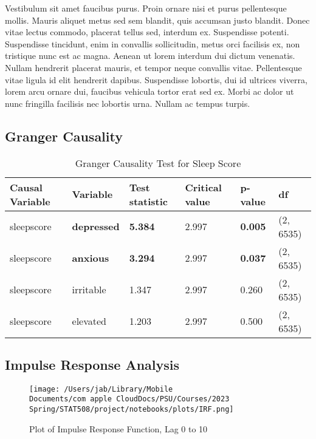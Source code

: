 \documentclass{article}
\begin{document}
Vestibulum sit amet faucibus purus. Proin ornare nisi et purus
pellentesque mollis. Mauris aliquet metus sed sem blandit, quis accumsan
justo blandit. Donec vitae lectus commodo, placerat tellus sed, interdum
ex. Suspendisse potenti. Suspendisse tincidunt, enim in convallis
sollicitudin, metus orci facilisis ex, non tristique nunc est ac magna.
Aenean ut lorem interdum dui dictum venenatis. Nullam hendrerit placerat
mauris, et tempor neque convallis vitae. Pellentesque vitae ligula id
elit hendrerit dapibus. Suspendisse lobortis, dui id ultrices viverra,
lorem arcu ornare dui, faucibus vehicula tortor erat sed ex. Morbi ac
dolor ut nunc fringilla facilisis nec lobortis urna. Nullam ac tempus
turpis.

\hypertarget{granger-causality-1}{%
\subsection{Granger Causality}\label{granger-causality-1}}

\begin{table}[hb]
    \centering
    \begin{tabular}{llllll}
    \toprule
        \textbf{Causal Variable} & \textbf{Variable} & \textbf{Test statistic} & \textbf{Critical value} & \textbf{p-value} & \textbf{df} \\
        \midrule
        sleepscore & \textbf{depressed} & \textbf{5.384} & 2.997 & \textbf{0.005} & (2, 6535) \\
        sleepscore & \textbf{anxious} & \textbf{3.294} & 2.997 & \textbf{0.037} & (2, 6535) \\
        sleepscore & irritable & 1.347 & 2.997 & 0.260 & (2, 6535) \\
        sleepscore & elevated & 1.203 & 2.997 & 0.500 & (2, 6535) \\
      \bottomrule
    \end{tabular}
    \caption{Granger Causality Test for Sleep Score}
    \label{Granger}
\end{table}


\hypertarget{impulse-response-analysis-1}{%
\subsection{Impulse Response Analysis}\label{impulse-response-analysis-1}}


\begin{figure}[ht]
\centering
  \texttt{[image: /Users/jab/Library/Mobile Documents/com~apple~CloudDocs/PSU/Courses/2023 Spring/STAT508/project/notebooks/plots/IRF.png]}
  \caption{Plot of Impulse Response Function, Lag 0 to 10}
  \label{IRF}
\end{figure}
\end{document}
